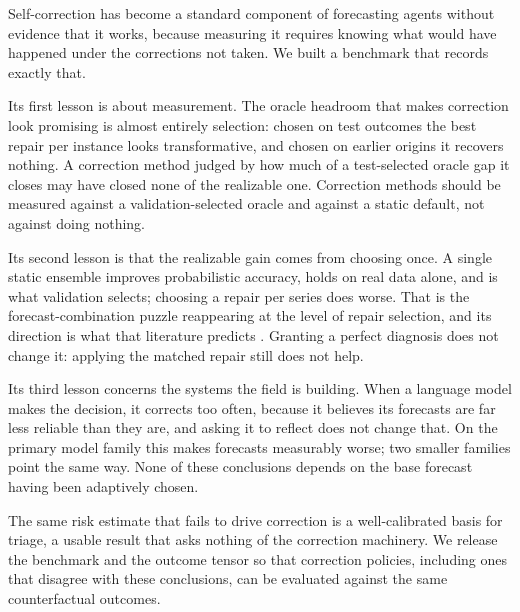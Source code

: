 Self-correction has become a standard component of forecasting agents without evidence
that it works, because measuring it requires knowing what would have happened under the
corrections not taken. We built a benchmark that records exactly that.

Its first lesson is about measurement. The oracle headroom that makes correction look
promising is almost entirely selection: chosen on test outcomes the best repair per
instance looks transformative, and chosen on earlier origins it recovers nothing. A
correction method judged by how much of a test-selected oracle gap it closes may have
closed none of the realizable one. Correction methods should be measured against a
validation-selected oracle and against a static default, not against doing nothing.

Its second lesson is that the realizable gain comes from choosing once. A single static
ensemble improves probabilistic accuracy, holds on real data alone, and is what
validation selects; choosing a repair per series does worse. That is the
forecast-combination puzzle \citep{stockwatson2004,smithwallis2009,claeskens2016}
reappearing at the level of repair selection, and its direction is what that literature
predicts \citep{bates1969,timmermann2006,wang2023review}. Granting a perfect diagnosis
does not change it: applying the matched repair still does not help.

Its third lesson concerns the systems the field is building. When a language model makes
the decision, it corrects too often, because it believes its forecasts are far less
reliable than they are, and asking it to reflect does not change that. On the primary
model family this makes forecasts measurably worse; two smaller families point the same
way. None of these conclusions depends on the base forecast having been adaptively
chosen.

The same risk estimate that fails to drive correction is a well-calibrated basis for
triage, a usable result that asks nothing of the correction machinery. We release the
benchmark and the outcome tensor so that correction policies, including ones that
disagree with these conclusions, can be evaluated against the same counterfactual
outcomes.
